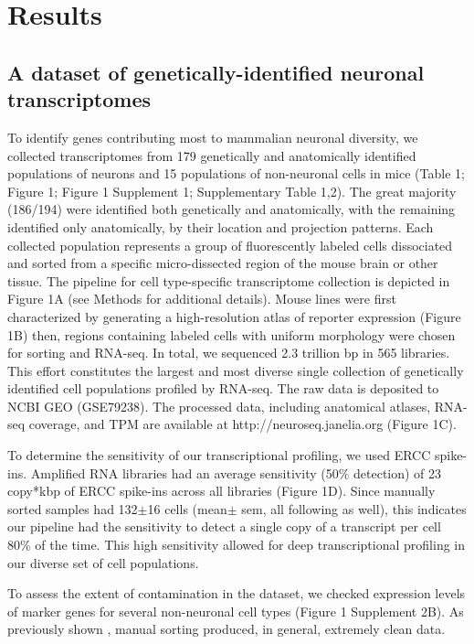 \section{Results}

\subsection{A dataset of genetically-identified neuronal transcriptomes}
To identify genes contributing most to mammalian neuronal diversity, we collected transcriptomes from 179 genetically and anatomically identified populations of neurons and 15 populations of non-neuronal cells in mice (Table 1; Figure 1; Figure 1 Supplement 1; Supplementary Table 1,2). The great majority (186/194) were identified both genetically and anatomically, with the remaining identified only anatomically, by their location and projection patterns. Each collected population represents a group of fluorescently labeled cells dissociated and sorted from a specific micro-dissected region of the mouse brain or other tissue. The pipeline for cell type-specific transcriptome collection is depicted in Figure 1A (see Methods for additional details). Mouse lines were first characterized by generating a high-resolution atlas of reporter expression (Figure 1B) then, regions containing labeled cells with uniform morphology were chosen for sorting and RNA-seq. In total, we sequenced 2.3 trillion bp in 565 libraries. This effort constitutes the largest and most diverse single collection of genetically identified cell populations profiled by RNA-seq. The raw data is deposited to NCBI GEO (GSE79238). The processed data, including anatomical atlases, RNA-seq coverage, and TPM are available at http://neuroseq.janelia.org (Figure 1C).

To determine the sensitivity of our transcriptional profiling, we used ERCC spike-ins. Amplified RNA libraries had an average sensitivity (50\% detection) of 23 copy*kbp of ERCC spike-ins across all libraries (Figure 1D). Since manually sorted samples had 132$\pm$16 cells (mean$\pm$ sem, all following as well), this indicates our pipeline had the sensitivity to detect a single copy of a transcript per cell 80\% of the time. This high sensitivity allowed for deep transcriptional profiling in our diverse set of cell populations.

To assess the extent of contamination in the dataset, we checked expression levels of marker genes for several non-neuronal cell types (Figure 1 Supplement 2B). As previously shown \citep{Okaty_2011}, manual sorting produced, in general, extremely clean data.

